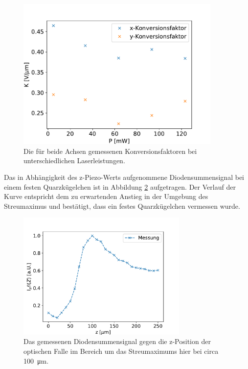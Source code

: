             \begin{figure}[h]
            \centering
            \includegraphics[width = 0.9\textwidth]{Konversion.pdf}
            \caption{Die für beide Achsen gemessenen Konversionsfaktoren bei unterschiedlichen Laserleistungen.}
            \label{fig:Konversion}
            \end{figure}
            \FloatBarrier
            \newpage
            Das in Abhängigkeit des z-Piezo-Werts aufgenommene Diodensummensignal bei einem festen Quarzkügelchen ist in Abbildung \ref{fig:Diodensumme} aufgetragen. Der Verlauf der Kurve entspricht dem zu erwartenden Anstieg in der Umgebung des Streumaximus und bestätigt, dass ein festes Quarzkügelchen vermessen wurde.
            \begin{figure}[h]
            \centering
            \includegraphics[width = 0.75\textwidth]{Diodensumme.pdf}
            \caption{Das gemessenen Diodensummensignal gegen die z-Position der optischen Falle im Bereich um das Streumaximums hier bei circa \SI{100}{\micro\metre}.}
            \label{fig:Diodensumme}
            \end{figure}
            \FloatBarrier



